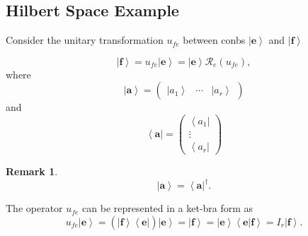 \documentclass[aps,preprint]{revtex4}
\newtheorem{remark}[theorem]{Remark}
\begin{document}
\subsection{Hilbert Space Example \label{Hilbert Space Example}}

Consider the unitary transformation $u_{fe}$ between conbs $\left\vert 
\boldsymbol{e}\right\rangle $ and $\left\vert \boldsymbol{f}\right\rangle $

\begin{equation}
\left\vert \boldsymbol{f}\right\rangle =u_{fe}\left\vert \boldsymbol{e}%
\right\rangle =\left\vert \boldsymbol{e}\right\rangle \mathcal{R}_{e}\left(
u_{fe}\right) ,
\end{equation}%
where 
\begin{equation}
\left\vert \boldsymbol{a}\right\rangle =\left( 
\begin{array}{ccc}
\left\vert a_{1}\right\rangle & \cdots & \left\vert a_{r}\right\rangle%
\end{array}%
\right)
\end{equation}%
and 
\begin{equation}
\left\langle \boldsymbol{a}\right\vert =\left( 
\begin{array}{c}
\left\langle a_{1}\right\vert \\ 
\vdots \\ 
\left\langle a_{r}\right\vert%
\end{array}%
\right)
\end{equation}

\begin{remark}
\begin{equation}
\left\vert \boldsymbol{a}\right\rangle =\left\langle \boldsymbol{a}%
\right\vert ^{\dagger }.
\end{equation}
\end{remark}

The operator $u_{fe}$ can be represented in a ket-bra form as 
\begin{equation*}
u_{fe}\left\vert \boldsymbol{e}\right\rangle =\left( \overset{}{\left\vert 
\boldsymbol{f}\right\rangle \left\langle \boldsymbol{e}\right\vert }\right)
\left\vert \boldsymbol{e}\right\rangle =\left\vert \boldsymbol{f}%
\right\rangle =\left\vert \boldsymbol{e}\right\rangle \left\langle \left. 
\boldsymbol{e}\right\vert \boldsymbol{f}\right\rangle =I_{r}\left\vert 
\boldsymbol{f}\right\rangle .
\end{equation*}
\end{document}
